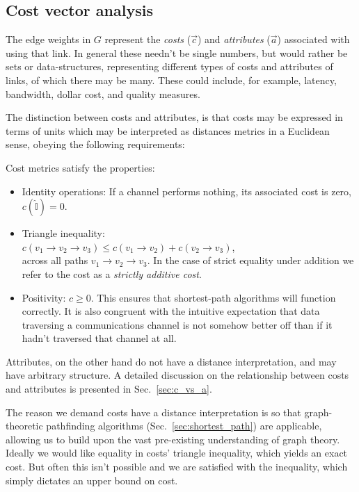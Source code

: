 %
%

\subsection{Cost vector analysis} \label{sec:costs} 

The edge weights in $G$ represent the \textit{costs} ($\vec c$) and \textit{attributes} ($\vec a$) associated with using that link. In general these needn't be single numbers, but would rather be sets or data-structures, representing different types of costs and attributes of links, of which there may be many. These could include, for example, latency, bandwidth, dollar cost, and quality measures.

The distinction between costs and attributes, is that costs may be expressed in terms of units which may be interpreted as distances metrics in a Euclidean sense, obeying the following requirements:

\begin{definition} \label{def:metric} Cost metrics satisfy the properties:
	\begin{itemize}
    	\item Identity operations: If a channel performs nothing, its associated cost is zero, \mbox{$c(\mathbb{\hat{I}}) = 0$}.
    	\item Triangle inequality: \\ $c(v_1\to v_2\to v_3) \leq c(v_1\to v_2) + c(v_2\to v_3)$, \\ across all paths \mbox{$v_1 \to v_2 \to v_3$}. In the case of strict equality under addition we refer to the cost as a \textit{strictly additive cost}.
    	\item Positivity: \mbox{$c\geq 0$}. This ensures that shortest-path algorithms will function correctly. It is also congruent with the intuitive expectation that data traversing a communications channel is not somehow better off than if it hadn't traversed that channel at all.
	\end{itemize}
\end{definition}
Attributes, on the other hand do not have a distance interpretation, and may have arbitrary structure. A detailed discussion on the relationship between costs and attributes is presented in Sec.~\ref{sec:c_vs_a}.

The reason we demand costs have a distance interpretation is so that graph-theoretic pathfinding algorithms (Sec.~\ref{sec:shortest_path}) are applicable, allowing us to build upon the vast pre-existing understanding of graph theory. Ideally we would like equality in costs' triangle inequality, which yields an exact cost. But often this isn't possible and we are satisfied with the inequality, which simply dictates an upper bound on cost.


